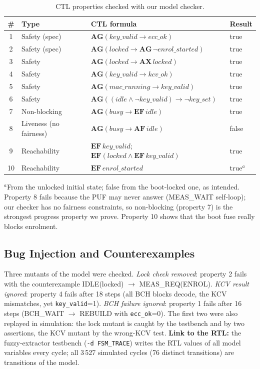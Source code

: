 \documentclass[11pt,a4paper]{article}
\begin{document}
\begin{table}[H]\centering\small
\caption{CTL properties checked with our model checker.}\label{tab:ctl}
\begin{tabularx}{\linewidth}{@{}clXl@{}}
\toprule
\# & Type & CTL formula & Result\\
\midrule
1 & Safety (spec) & $\mathbf{AG}(\mathit{key\_valid}\rightarrow \mathit{ecc\_ok})$ & true\\
2 & Safety (spec) & $\mathbf{AG}(\mathit{locked}\rightarrow\mathbf{AG}\,\neg\mathit{enrol\_started})$ & true\\
3 & Safety & $\mathbf{AG}(\mathit{locked}\rightarrow\mathbf{AX}\,\mathit{locked})$ & true\\
4 & Safety & $\mathbf{AG}(\mathit{key\_valid}\rightarrow \mathit{kcv\_ok})$ & true\\
5 & Safety & $\mathbf{AG}(\mathit{mac\_running}\rightarrow \mathit{key\_valid})$ & true\\
6 & Safety & $\mathbf{AG}((\mathit{idle}\wedge\neg\mathit{key\_valid})\rightarrow\neg\mathit{key\_set})$ & true\\
7 & Non-blocking & $\mathbf{AG}(\mathit{busy}\rightarrow\mathbf{EF}\,\mathit{idle})$ & true\\
8 & Liveness (no fairness) & $\mathbf{AG}(\mathit{busy}\rightarrow\mathbf{AF}\,\mathit{idle})$ & false\\
9 & Reachability & $\mathbf{EF}\,\mathit{key\_valid}$; $\mathbf{EF}(\mathit{locked}\wedge\mathbf{EF}\,\mathit{key\_valid})$ & true\\
10 & Reachability & $\mathbf{EF}\,\mathit{enrol\_started}$ & true$^{a}$\\
\bottomrule
\end{tabularx}
\end{table}
$^{a}$From the unlocked initial state; false from the boot-locked one, as intended.
Property 8 fails because the PUF may never answer (MEAS\_WAIT self-loop); our checker has no fairness
constraints, so non-blocking (property 7) is the strongest progress property we prove. Property 10 shows
that the boot fuse really blocks enrolment.

\subsection{Bug Injection and Counterexamples}
Three mutants of the model were checked. \emph{Lock check removed}: property 2 fails with the
counterexample IDLE(locked) $\rightarrow$ MEAS\_REQ(ENROL). \emph{KCV result ignored}: property 4 fails
after 18 steps (all BCH blocks decode, the KCV mismatches, yet \texttt{key\_valid}=1).
\emph{BCH failure ignored}: property 1 fails after 16 steps (BCH\_WAIT $\rightarrow$ REBUILD with
\texttt{ecc\_ok}=0). The first two were also replayed in simulation: the lock mutant is caught by the
testbench and by two assertions, the KCV mutant by the wrong-KCV test. \textbf{Link to the RTL:} the
fuzzy-extractor testbench (\texttt{-d FSM\_TRACE}) writes the RTL values of all model variables every
cycle; all 3\,527 simulated cycles (76 distinct transitions) are transitions of the model.
\end{document}
